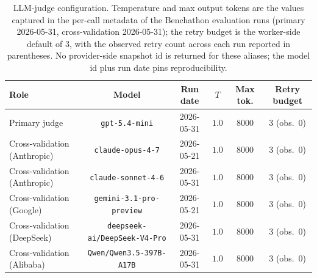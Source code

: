 \begin{table}[t]
\centering\footnotesize
\caption{LLM-judge configuration. Temperature and max output tokens are the values captured in the per-call metadata of the Benchathon evaluation runs (primary 2026-05-31, cross-validation 2026-05-31); the retry budget is the worker-side default of 3, with the observed retry count across each run reported in parentheses. No provider-side snapshot id is returned for these aliases; the model id plus run date pins reproducibility.}
\label{tbl-judge-config}
\setlength{\tabcolsep}{4pt}
\begin{tabular*}{\textwidth}{@{\extracolsep{\fill}}lccccc@{}}
\toprule
Role & Model & Run date & $T$ & Max tok. & Retry budget \\
\midrule
Primary judge & \texttt{gpt-5.4-mini} & 2026-05-31 & $1.0$ & $8000$ & $3$ (obs.\ $0$) \\
Cross-validation (Anthropic) & \texttt{claude-opus-4-7} & 2026-05-21 & $1.0$ & $8000$ & $3$ (obs.\ $0$) \\
Cross-validation (Anthropic) & \texttt{claude-sonnet-4-6} & 2026-05-31 & $1.0$ & $8000$ & $3$ (obs.\ $0$) \\
Cross-validation (Google) & \texttt{gemini-3.1-pro-preview} & 2026-05-21 & $1.0$ & $8000$ & $3$ (obs.\ $0$) \\
Cross-validation (DeepSeek) & \texttt{deepseek-ai/DeepSeek-V4-Pro} & 2026-05-31 & $1.0$ & $8000$ & $3$ (obs.\ $0$) \\
Cross-validation (Alibaba) & \texttt{Qwen/Qwen3.5-397B-A17B} & 2026-05-31 & $1.0$ & $8000$ & $3$ (obs.\ $0$) \\
\bottomrule
\end{tabular*}
\end{table}

